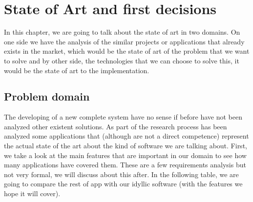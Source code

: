 \chapter{State of Art and first decisions}

In this chapter, we are going to talk about the state of art in two domains.
On one side we have the analysis of the similar projects or applications that
already exists in the market, which would be the state of art of the problem
that we want to solve and by other side, the technologies that we can choose
to solve this, it would be the state of art to the implementation.

\section{Problem domain}

The developing of a new complete system have no sense if before have not been
analyzed other existent solutions. As part of the research process has been
analyzed some applications that (although are not a direct competence) represent
the actual state of the art about the kind of software we are talking about.
\intro
First, we take a look at the main features that are important in our domain
to see how many applications have covered them. These are a few requirements
analysis but not very formal, we will discuss about this after.
\intro
\pagebreak
\intro In the following table, we are going to compare the rest of app with our idyllic
software (with the features we hope it will cover).

